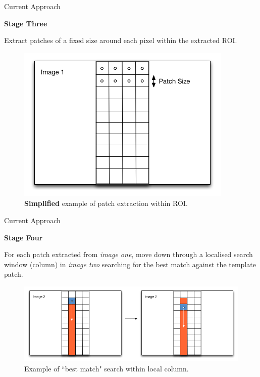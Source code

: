 \documentclass[10pt, compress]{beamer}
\begin{document}
\begin{frame}{Current Approach}

\textbf{Stage Three} \\ \vspace{0.2cm}

Extract patches of a fixed size around each pixel within the extracted ROI.

\begin{figure}[ht!]
\centering
\includegraphics[scale=0.4]{stage2.png}
\caption{\textbf{Simplified} example of patch extraction within ROI.}
  \end{figure}
  
\end{frame}

\begin{frame}{Current Approach}

\textbf{Stage Four} \\ \vspace{0.2cm}

For each patch extracted from \emph{image one}, move down through a localised search window (column) in \emph{image two} searching for the best match against the template patch. 

\begin{figure}[ht!]
\centering
\includegraphics[scale=0.35]{stage3.png}
\caption{Example of ``best match" search within local column.}
\end{figure}
  
\end{frame}
\end{document}
